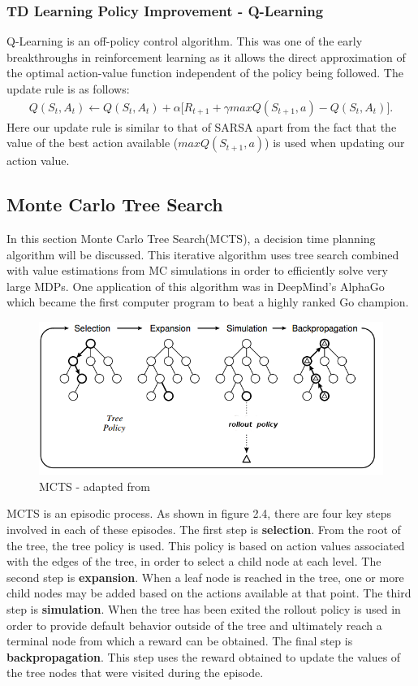 \subsubsection{TD Learning Policy Improvement - Q-Learning}
Q-Learning is an off-policy control algorithm.
This was one of the early breakthroughs in reinforcement learning as it allows the direct approximation of
the optimal action-value function independent of the policy being followed.
The update rule is as follows:
\begin{align}
    Q(S_t, A_t) \leftarrow Q(S_t, A_t) + \alpha \lbrack R_{t+1} + \gamma maxQ(S_{t+1}, a) - Q(S_t, A_t) \rbrack.
\end{align}
Here our update rule is similar to that of SARSA apart from the fact that the value of the best
action available ($maxQ(S_{t+1}, a)$) is used when updating our action value.

\subsection{Monte Carlo Tree Search}\label{subsec:mcts}
In this section Monte Carlo Tree Search(MCTS), a decision time planning algorithm will be discussed.
This iterative algorithm uses tree search combined with value estimations from MC simulations in order to
efficiently solve very large MDPs.
One application of this algorithm was in DeepMind's AlphaGo\citep{silver2016mastering} which became the
first computer program to beat a highly ranked Go champion.

\begin{figure}[!ht]
    \includegraphics[scale=.8]{images/MCTS.png}
    \caption{MCTS - adapted from\citep{lim2016field}}
\end{figure}

MCTS is an episodic process.
As shown in figure 2.4, there are four key steps involved in each of these episodes.
The first step is \textbf{selection}.
From the root of the tree, the tree policy is used.
This policy is based on action values associated with the edges of the tree, in order
to select a child node at each level\citep{sutton1998reinforcement}.
The second step is \textbf{expansion}.
When a leaf node is reached in the tree, one or more child nodes may be added based on
the actions available at that point.
The third step is \textbf{simulation}.
When the tree has been exited the rollout policy is used in
order to provide default behavior outside of the tree and ultimately reach a
terminal node from which a reward can be obtained.
The final step is \textbf{backpropagation}.
This step  uses the reward obtained to update the values of the tree nodes that were visited
during the episode.


